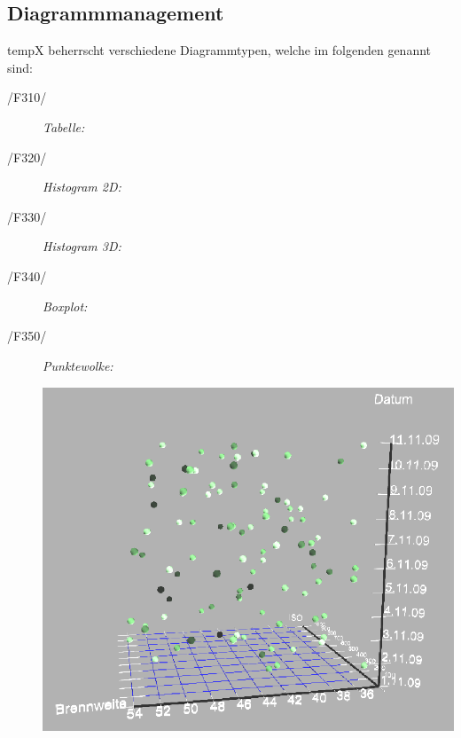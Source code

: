 \subsection{Diagrammmanagement}

\label{subsec:diagrammmgmt}

	\gls{tempX} beherrscht verschiedene Diagrammtypen, welche im folgenden genannt sind:
	
	\begin{description}

		\item[/F310/] \textit{Tabelle:}\par 
		

		\item[/F320/] \textit{Histogram 2D:}\par 
		
		
		\item[/F330/] \textit{Histogram 3D:}\par 
		

		\item[/F340/] \textit{Boxplot:}\par 
		

		\item[/F350/] \textit{Punktewolke:}\par 
		\includegraphics{images/punktewolke.eps} 

	\end{description}


